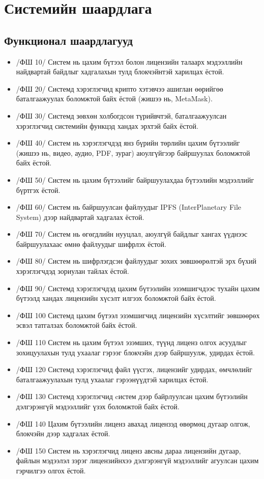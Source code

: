 \section{Системийн шаардлага}

\subsection{Функционал шаардлагууд}
\begin{itemize}
      \item[] /ФШ 10/ Систем нь цахим бүтээл болон лицензийн талаарх мэдээллийн найдвартай байдлыг хадгалахын тулд блокчэйнтэй харилцах ёстой.
      \item[] /ФШ 20/ Системд хэрэглэгчид крипто хэтэвчээ ашиглан өөрийгөө баталгаажуулах боломжтой байх ёстой (жишээ нь, MetaMask).
      \item[] /ФШ 30/ Системд зөвхөн холбогдсон түрийвчтэй, баталгаажуулсан хэрэглэгчид системийн функцэд хандах эрхтэй байх ёстой.
      \item[] /ФШ 40/ Систем нь хэрэглэгчдэд янз бүрийн төрлийн цахим бүтээлийг (жишээ нь, видео, аудио, PDF, зураг) аюулгүйгээр байршуулах боломжтой байх ёстой.
      \item[] /ФШ 50/ Систем нь цахим бүтээлийг байршуулахдаа бүтээлийн мэдээллийг бүртгэх ёстой.
      \item[] /ФШ 60/ Систем нь байршуулсан файлуудыг IPFS (InterPlanetary File System) дээр найдвартай хадгалах ёстой.
      \item[] /ФШ 70/ Систем нь өгөгдлийн нууцлал, аюулгүй байдлыг хангах үүднээс байршуулахаас өмнө файлуудыг шифрлэх ёстой.
      \item[] /ФШ 80/ Систем нь шифрлэгдсэн файлуудыг зохих зөвшөөрөлтэй эрх бүхий хэрэглэгчдэд зориулан тайлах ёстой.
      \item[] /ФШ 90/ Системд хэрэглэгчдэд цахим бүтээлийн эзэмшигчдээс тухайн цахим бүтээлд хандах лицензийн хүсэлт илгээх боломжтой байх ёстой.
      \item[] /ФШ 100  Системд цахим бүтээл эзэмшигчид лицензийн хүсэлтийг зөвшөөрөх эсвэл татгалзах боломжтой байх ёстой.
      \item[] /ФШ 110  Систем нь цахим бүтээл эзэмших, түүнд лиценз олгох асуудлыг зохицуулахын тулд ухаалаг гэрээг блокчэйн дээр байршуулж, удирдах ёстой.
      \item[] /ФШ 120  Системд хэрэглэгчид файл үүсгэх, лицензийг удирдах, өмчлөлийг баталгаажуулахын тулд ухаалаг гэрээнүүдтэй харилцах ёстой.
      \item[] /ФШ 130  Системд хэрэглэгчид cистем дээр байрлуулсан цахим бүтээлийн дэлгэрэнгүй мэдээллийг үзэх боломжтой байх ёстой.
      \item[] /ФШ 140  Цахим бүтээлийн лиценз авахад лицензэд өвөрмөц дугаар олгож, блокчэйн дээр хадгалах ёстой.
      \item[] /ФШ 150  Систем нь хэрэглэгчид лиценз авсны дараа лицензийн дугаар, файлын мэдээлэл зэрэг лицензийнхээ дэлгэрэнгүй мэдээллийг агуулсан цахим гэрчилгээ олгох ёстой.
\end{itemize}


